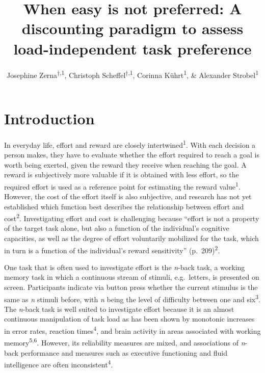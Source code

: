 \documentclass[
  man,floatsintext]{apa6}
\title{When easy is not preferred: A discounting paradigm to assess load-independent task preference}
\author{Josephine Zerna\textsuperscript{$\dagger{}$,1}, Christoph Scheffel\textsuperscript{$\dagger{}$,1}, Corinna Kührt\textsuperscript{1}, \& Alexander Strobel\textsuperscript{1}}
\date{}
\affiliation{\vspace{0.5cm}\textsuperscript{1} Faculty of Psychology, Technische Universität Dresden, 01069 Dresden, Germany}
\begin{document}
\maketitle

\renewcommand\thesection{\Alph{section}}
\setcounter{figure}{0}

\hypertarget{introduction}{%
\section{Introduction}\label{introduction}}

In everyday life, effort and reward are closely intertwined\textsuperscript{1}.
With each decision a person makes, they have to evaluate whether the effort required to reach a goal is worth being exerted, given the reward they receive when reaching the goal.
A reward is subjectively more valuable if it is obtained with less effort, so the required effort is used as a reference point for estimating the reward value\textsuperscript{1}.
However, the cost of the effort itself is also subjective, and research has not yet established which function best describes the relationship between effort and cost\textsuperscript{2}.
Investigating effort and cost is challenging because ``effort is not a property of the target task alone, but also a function of the individual's cognitive capacities, as well as the degree of effort voluntarily mobilized for the task, which in turn is a function of the individual's reward sensitivity'' (p.~209)\textsuperscript{2}.

One task that is often used to investigate effort is the \emph{n}-back task, a working memory task in which a continuous stream of stimuli, e.g.~letters, is presented on screen.
Participants indicate via button press whether the current stimulus is the same as \emph{n} stimuli before, with \emph{n} being the level of difficulty between one and six\textsuperscript{3}.
The \emph{n}-back task is well suited to investigate effort because it is an almost continuous manipulation of task load as has been shown by monotonic increases in error rates, reaction times\textsuperscript{4}, and brain activity in areas associated with working memory\textsuperscript{5,6}.
However, its reliability measures are mixed, and associations of \emph{n}-back performance and measures such as executive functioning and fluid intelligence are often inconsistent\textsuperscript{4}.
\end{document}
